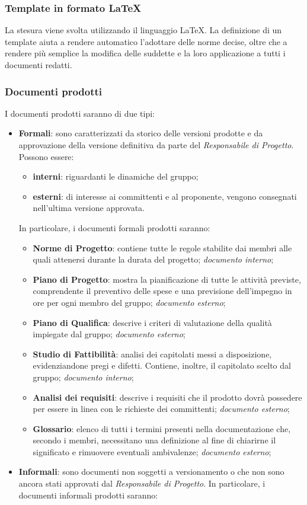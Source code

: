 \subsubsection{Template in formato \LaTeX}

La stesura viene svolta utilizzando il linguaggio \LaTeX . La definizione di un template aiuta a rendere automatico l'adottare delle norme decise, oltre che a rendere più semplice la modifica delle suddette e la loro applicazione a tutti i documenti redatti.

\subsubsection{Documenti prodotti}
I documenti prodotti saranno di due tipi:
\begin{itemize}
	\item \textbf{Formali}: sono caratterizzati da storico delle versioni prodotte e da approvazione della versione definitiva da parte del \textit{Responsabile di Progetto}. Possono essere:
	\begin{itemize}
		\item \textbf{interni}: riguardanti le dinamiche del gruppo;
		\item \textbf{esterni}: di interesse ai committenti e al proponente, vengono consegnati nell'ultima versione approvata.
	\end{itemize} 
In particolare, i documenti formali prodotti saranno:
	\begin{itemize}
		\item \textbf{Norme di Progetto}: contiene tutte le regole stabilite dai membri alle quali attenersi durante la durata del progetto; \textit{documento interno};
	\item \textbf{Piano di Progetto}: mostra la pianificazione di tutte le attività previste, comprendente il preventivo delle spese e una previsione dell'impegno in ore per ogni membro del gruppo; \textit{documento esterno};
	\item \textbf{Piano di Qualifica}: descrive i criteri di valutazione della qualità impiegate dal gruppo; \textit{documento esterno};
	\item \textbf{Studio di Fattibilità}: analisi dei capitolati messi a disposizione, evidenziandone pregi e difetti. Contiene,  inoltre,  il capitolato scelto dal gruppo; \textit{documento interno};
	\item \textbf{Analisi dei requisiti}: descrive i requisiti che il prodotto dovrà possedere per essere in linea con le richieste dei committenti; \textit{documento esterno};
	\item \textbf{Glossario}: elenco di tutti i termini presenti nella documentazione che, secondo i membri, necessitano una definizione al fine di chiarirne il significato e rimuovere eventuali ambivalenze; \textit{documento esterno};
	\end{itemize}
\item \textbf{Informali}: sono documenti non soggetti a versionamento o che non sono ancora stati approvati dal \textit{Responsabile di Progetto}. \newline 
In particolare, i documenti informali prodotti saranno:
	\begin{itemize}
	

\end{itemize}
\end{itemize}
